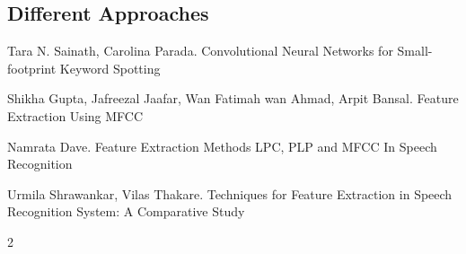 \documentclass[twoside]{article}
\begin{document}
\begin{multicols}{2}
\section{Different Approaches}





\begin{thebibliography}{99}

Tara N. Sainath, Carolina Parada.
\newblock Convolutional Neural Networks for Small-footprint Keyword Spotting

Shikha Gupta, Jafreezal Jaafar, Wan Fatimah wan Ahmad, Arpit Bansal.
\newblock Feature Extraction Using MFCC

Namrata Dave.
\newblock Feature Extraction Methods LPC, PLP and MFCC In Speech Recognition

Urmila Shrawankar, Vilas Thakare.
\newblock Techniques for Feature Extraction in Speech Recognition System: A Comparative Study

\end{thebibliography}


\end{multicols}{2}
\end{document}
